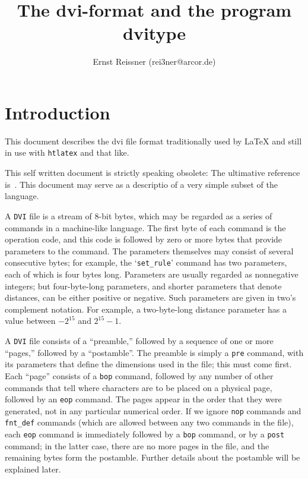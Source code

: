 \documentclass[10pt, a4paper]{article}
\title{The dvi-format and the program dvitype}
\author{Ernst Reissner (rei3ner@arcor.de)}
\date{}
\begin{document}
\maketitle
\tableofcontents

\section{Introduction}
This document describes the dvi file format 
traditionally used by \LaTeX{} 
and still in use with \texttt{htlatex} and that like. 

This self written document is strictly speaking obsolete: 
The ultimative reference is~\cite{DviType}. 
This document may serve as a descriptio of a very simple subset of the language. 

A \texttt{DVI} file is a stream of 8-bit bytes, which may be regarded as a
series of commands in a machine-like language. The first byte of each command
is the operation code, and this code is followed by zero or more bytes
that provide parameters to the command. The parameters themselves may consist
of several consecutive bytes; 
for example, the `\texttt{set\_rule}' command has two
parameters, each of which is four bytes long. Parameters are usually
regarded as nonnegative integers; but four-byte-long parameters,
and shorter parameters that denote distances, can be
either positive or negative. Such parameters are given in two's complement
notation. For example, a two-byte-long distance parameter has a value between
$-2^{15}$ and $2^{15}-1$.


A \texttt{DVI} file consists of a ``preamble,'' 
followed by a sequence of one or more ``pages,'' 
followed by a ``postamble''. 
The preamble is simply a \texttt{pre} command, 
with its parameters that define the dimensions used in the file; 
this must come first.  
Each ``page'' consists of a \texttt{bop} command,
followed by any number of other commands that tell where characters are to
be placed on a physical page, followed by an \texttt{eop} command. 
The pages appear in the order that they were generated, 
not in any particular numerical order. 
If we ignore \texttt{nop} commands and \texttt{fnt\_def} commands
(which are allowed between any two commands in the file), 
each \texttt{eop} command is immediately followed by a \texttt{bop} command, 
or by a \texttt{post} command; 
in the latter case, there are no more pages in the file, 
and the remaining bytes form the postamble.  
Further details about the postamble will be explained later.
\end{document}
